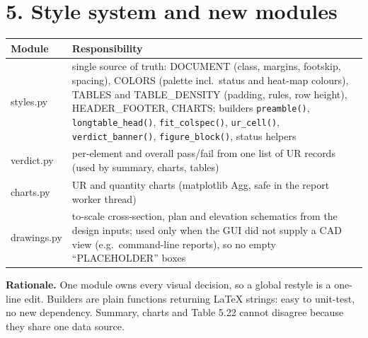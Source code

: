 \documentclass[11pt,a4paper]{article}
\begin{document}
\section*{5. Style system and new modules}
\begin{tabularx}{\textwidth}{@{}>{\ttfamily}l Y@{}}
\toprule
\textrm{\textbf{Module}} & \textbf{Responsibility}\\
\midrule
styles.py & single source of truth: DOCUMENT (class, margins, footskip, spacing), COLORS (palette incl.\
status and heat-map colours), TABLES and TABLE\_DENSITY (padding, rules, row height), HEADER\_FOOTER, CHARTS;
builders \verb|preamble()|, \verb|longtable_head()|, \verb|fit_colspec()|, \verb|ur_cell()|,
\verb|verdict_banner()|, \verb|figure_block()|, status helpers\\
verdict.py & per-element and overall pass/fail from one list of UR records (used by summary, charts, tables)\\
charts.py & UR and quantity charts (matplotlib Agg, safe in the report worker thread)\\
drawings.py & to-scale cross-section, plan and elevation schematics from the design inputs; used only when the
GUI did not supply a CAD view (e.g.\ command-line reports), so no empty ``PLACEHOLDER'' boxes\\
\bottomrule
\end{tabularx}

\textbf{Rationale.} One module owns every visual decision, so a global restyle is a one-line edit. Builders are
plain functions returning LaTeX strings: easy to unit-test, no new dependency. Summary, charts and Table 5.22
cannot disagree because they share one data source.
\end{document}
